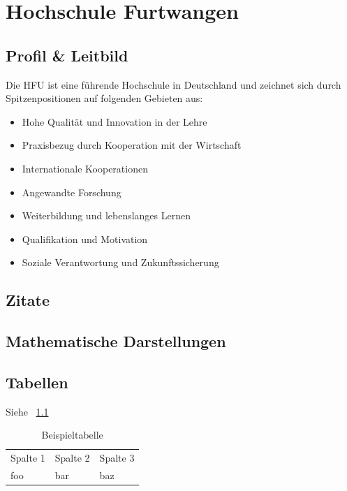 \chapter{Hochschule Furtwangen}

\section{Profil \& Leitbild}

Die \gls{HFU} ist eine führende Hochschule in Deutschland und zeichnet sich durch Spitzenpositionen auf folgenden Gebieten aus:

\begin{itemize}
    \item Hohe Qualität und Innovation in der Lehre
    \item Praxisbezug durch Kooperation mit der Wirtschaft
    \item Internationale Kooperationen
    \item Angewandte Forschung
    \item Weiterbildung und lebenslanges Lernen
    \item Qualifikation und Motivation
    \item Soziale Verantwortung und Zukunftssicherung
\end{itemize}

\section{Zitate}
\blindtext \autocite{the_art_of_computer_programming}

\section{Mathematische Darstellungen}

\blindmathpaper

\section{Tabellen}
Siehe \tablename\ \ref{tab:example}

\begin{table}[H]
    \centering
    \begin{tabular}{@{}lll@{}}
        \toprule
        Spalte 1 & Spalte 2 & Spalte 3 \\
        foo      & bar      & baz      \\
        \bottomrule
    \end{tabular}
    \caption{Beispieltabelle}
    \label{tab:example}
\end{table}

